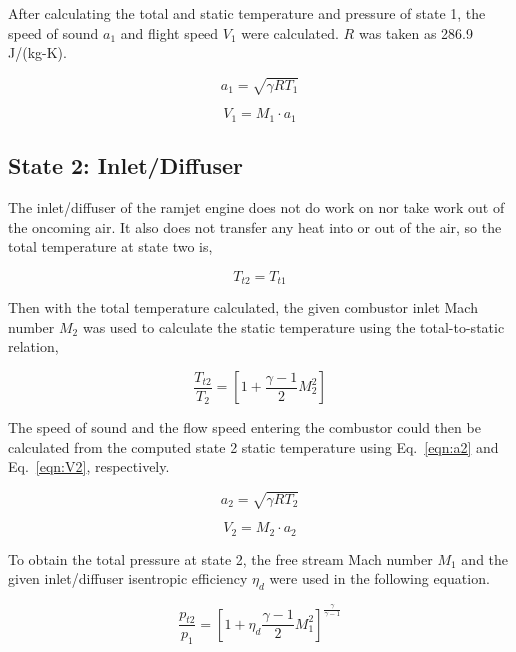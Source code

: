 \documentclass[conf]{new-aiaa} %
\begin{document}
After calculating the total and static temperature and pressure of state 1, the speed of sound $a_1$ and flight speed $V_1$ were calculated. $R$ was taken as 286.9 J/(kg-K).

\begin{equation}
    \label{eqn:a1}
    a_1=\sqrt{\gamma RT_1}
\end{equation}

\begin{equation}
    \label{eqn:V1}
    V_1=M_1\cdot a_1
\end{equation}

\subsection{State 2: Inlet/Diffuser}
The inlet/diffuser of the ramjet engine does not do work on nor take work out of the oncoming air. It also does not transfer any heat into or out of the air, so the total temperature at state two is,

\begin{equation}
    \label{eqn:Tt2}
    T_{t2}=T_{t1}
\end{equation}

Then with the total temperature calculated, the given combustor inlet Mach number $M_2$ was used to calculate the static temperature using the total-to-static relation,

\begin{equation}
    \label{eqn:T2}
    \frac{T_{t2}}{T_2}=\left[1+\frac{\gamma-1}{2}M_2^2\right]
\end{equation}

The speed of sound and the flow speed entering the combustor could then be calculated from the computed state 2 static temperature using Eq.~\eqref{eqn:a2} and Eq.~\eqref{eqn:V2}, respectively.

\begin{equation}
    \label{eqn:a2}
    a_2=\sqrt{\gamma R T_2}
\end{equation}

\begin{equation}
    \label{eqn:V2}
    V_2=M_2\cdot a_2
\end{equation}

To obtain the total pressure at state 2, the free stream Mach number $M_1$ and the given inlet/diffuser isentropic efficiency $\eta_d$ were used in the following equation.

\begin{equation}
    \label{eqn:pt2}
    \frac{p_{t2}}{p_1}=\left[1+\eta_d\frac{\gamma-1}{2}M_1^2\right]^{\frac{\gamma}{\gamma-1}}
\end{equation}
\end{document}
